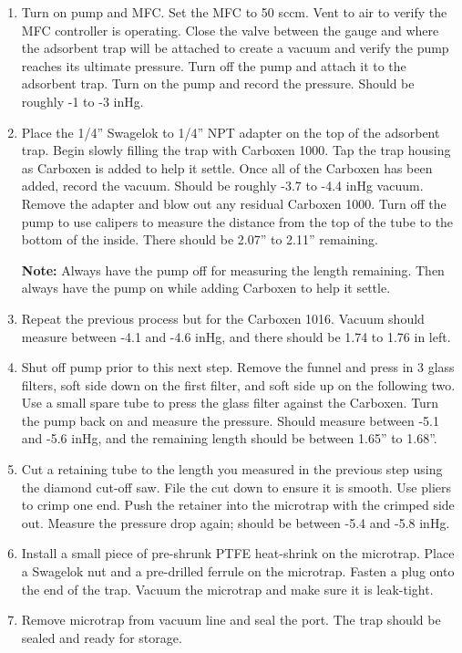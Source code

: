 \begin{enumerate}
\item Turn on pump and MFC. Set the MFC to 50 sccm. Vent to air to verify the MFC controller is operating. Close the valve between the gauge and where the adsorbent trap will be attached to create a vacuum and verify the pump reaches its ultimate pressure. Turn off the pump and attach it to the adsorbent trap. Turn on the pump and record the pressure. Should be roughly -1 to -3 inHg.

\item Place the 1/4'' Swagelok to 1/4'' NPT adapter on the top of the adsorbent trap. Begin slowly filling the trap with Carboxen 1000. Tap the trap housing as Carboxen is added to help it settle. Once all of the Carboxen has been added, record the vacuum. Should be roughly -3.7 to -4.4 inHg vacuum. Remove the adapter and blow out any residual Carboxen 1000. Turn off the pump to use calipers to measure the distance from the top of the tube to the bottom of the inside. There should be 2.07'' to 2.11'' remaining.

\textbf{Note:} Always have the pump off for measuring the length remaining. Then always have the pump on while adding Carboxen to help it settle.

\item Repeat the previous process but for the Carboxen 1016. Vacuum should measure between -4.1 and -4.6 inHg, and there should be 1.74 to 1.76 in left.

\item Shut off pump prior to this next step. Remove the funnel and press in 3 glass filters, soft side down on the first filter, and soft side up on the following two. Use a small spare tube to press the glass filter against the Carboxen. Turn the pump back on and measure the pressure. Should measure between -5.1 and -5.6 inHg, and the remaining length should be between 1.65'' to 1.68''.

\item Cut a retaining tube to the length you measured in the previous step using the diamond cut-off saw. File the cut down to ensure it is smooth. Use pliers to crimp one end. Push the retainer into the microtrap with the crimped side out. Measure the pressure drop again; should be between -5.4 and -5.8 inHg.

\item Install a small piece of pre-shrunk PTFE heat-shrink on the microtrap. Place a Swagelok nut and a pre-drilled ferrule on the microtrap. Fasten a plug onto the end of the trap. Vacuum the microtrap and make sure it is leak-tight.

\item Remove microtrap from vacuum line and seal the port. The trap should be sealed and ready for storage.

\end{enumerate}

